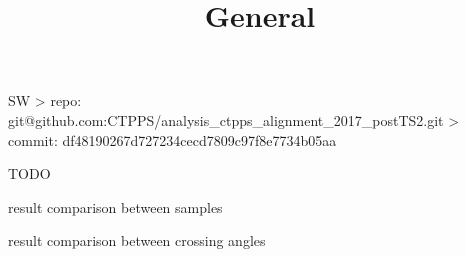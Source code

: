 


\newpage %

\def\author{J.~Kašpar}
\def\caption{CTPPS alignment 2018}
\def\date{\the\year/\the\month/\the\day}

\let\NormalFonts\SetFontSizesX

\newpage %
\title{General}

\> SW
\>> repo: git@github.com:CTPPS/analysis\_ctpps\_alignment\_2017\_postTS2.git
\>> commit: df48190267d727234cecd7809c97f8e7734b05aa

\> TODO
\iffalse
\> input data
\>> alignment runs:\\ /eos/totem/data/ctpps/reconstruction/2017/alignment\_run\_September/version7
\>> physics runs:\\ /eos/totem/data/ctpps/reconstruction/2017/postTS2\_alignment\_data/version5
\>>> from Run2017E-17Nov2017-v1/AOD and Run2017F-17Nov2017-v1/AOD

\> re-reco performed with\\
/afs/cern.ch/work/j/jkaspar/software/ctpps/development/uniform\_pixel\_reco\_2017/CMSSW\_10\_2\_0
\>> pixel tracks only build with planes that did not change settings during the post-TS2 period
\>>> sector 45: used only planes 0, 2 and 4
\>>> sector 56: used only planes 0, 1 and 3
\fi


\newpage %

\centerline{}

\newpage %

\> result comparison between samples

\centerline{}

\newpage %

\> result comparison between crossing angles

\centerline{}



